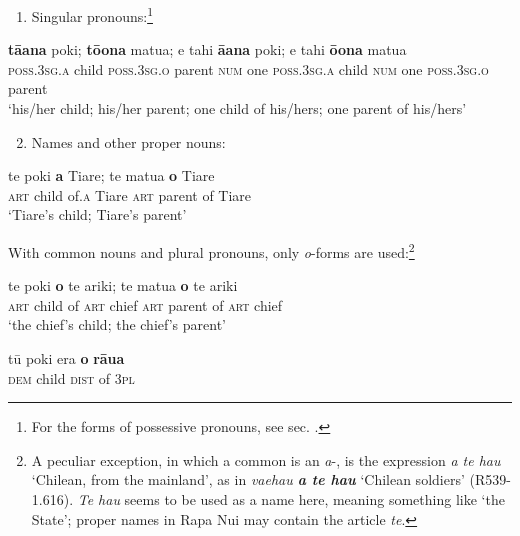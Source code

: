 \begin{enumerate}
\item 
Singular pronouns:\footnote{\label{fn:294}For the forms of possessive pronouns, see sec. .} 
\end{enumerate}

\ea\label{ex:6.54}
\gll
\textbf{tā{\ꞌ}ana} poki; \textbf{tō{\ꞌ}ona} matu{\ꞌ}a; e tahi \textbf{{\ꞌ}ā{\ꞌ}ana} poki; e tahi \textbf{ō{\ꞌ}ona} matu{\ꞌ}a\\
\textsc{poss.3sg.a} child \textsc{poss.3sg.o} parent \textsc{num} one \textsc{poss.3sg.a} child \textsc{num} one \textsc{poss.3sg.o} parent\\

\glt
‘his/her child; his/her parent; one child of his/hers; one parent of his/hers’ 
\z

\begin{enumerate}
\setcounter{enumi}{1}
\item 
Names and other proper nouns:
\end{enumerate}

\ea\label{ex:6.55}
\gll
te poki \textbf{{\ꞌ}a} Tiare; te matu{\ꞌ}a \textbf{o} Tiare\\
\textsc{art} child of\textsc{.a} Tiare \textsc{art} parent of Tiare\\

\glt
‘Tiare’s child; Tiare’s parent’  
\z

With common nouns and plural pronouns, only \textit{o}{}-forms are used:\footnote{\label{fn:295}A peculiar exception, in which a common  is an \textit{a}{}-, is the expression \textit{{\ꞌ}a te hau} ‘Chilean, from the mainland’, as in \textit{va{\ꞌ}ehau \textbf{{\ꞌ}a te hau}} ‘Chilean soldiers’ (R539-1.616). \textit{Te hau} seems to be used as a name here, meaning something like ‘the State’; proper names in Rapa Nui may contain the article \textit{te}.}

\ea\label{ex:6.56}
\gll
te poki \textbf{o} te {\ꞌ}ariki; te matu{\ꞌ}a \textbf{o} te {\ꞌ}ariki\\
\textsc{art} child of \textsc{art} chief \textsc{art} parent of \textsc{art} chief\\

\glt 
‘the chief’s child; the chief’s parent’\textstyleExampleref{} 
\z

\ea\label{ex:6.57}
\gll
tū poki era \textbf{o} \textbf{rāua}\\
\textsc{dem} child \textsc{dist} of \textsc{3pl}\\

